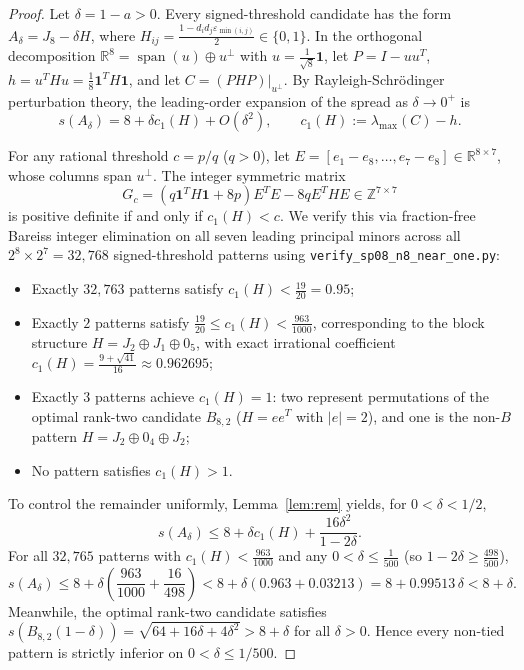 \documentclass[11pt,reqno]{article}
\theoremstyle{definition}
\newcommand{\R}{\mathbb{R}}
\newcommand{\Z}{\mathbb{Z}}
\newcommand{\one}{\mathbf{1}}
\begin{document}
\begin{proof}
Let $\delta = 1 - a > 0$. Every signed-threshold candidate has the form $A_\delta = J_8 - \delta H$, where $H_{ij} = \frac{1 - d_i d_j \varepsilon_{\min(i,j)}}{2} \in \{0, 1\}$. In the orthogonal decomposition $\R^8 = \operatorname{span}(u) \oplus u^\perp$ with $u = \frac{1}{\sqrt{8}}\one$, let $P = I - u u^T$, $h = u^T H u = \frac{1}{8}\one^T H \one$, and let $C = (P H P)|_{u^\perp}$. By Rayleigh-Schr\"odinger perturbation theory, the leading-order expansion of the spread as $\delta \to 0^+$ is
\begin{equation}
s(A_\delta) = 8 + \delta c_1(H) + O(\delta^2), \qquad c_1(H) := \lambda_{\max}(C) - h.
\end{equation}

For any rational threshold $c = p/q$ ($q > 0$), let $E = [e_1 - e_8, \dots, e_7 - e_8] \in \R^{8 \times 7}$, whose columns span $u^\perp$. The integer symmetric matrix
\begin{equation}
G_c = (q \one^T H \one + 8p) E^T E - 8q E^T H E \in \Z^{7 \times 7}
\end{equation}
is positive definite if and only if $c_1(H) < c$. We verify this via fraction-free Bareiss integer elimination \cite{bareiss1968} on all seven leading principal minors across all $2^8 \times 2^7 = 32{,}768$ signed-threshold patterns using \texttt{verify\_sp08\_n8\_near\_one.py}:
\begin{itemize}
    \item Exactly $32{,}763$ patterns satisfy $c_1(H) < \frac{19}{20} = 0.95$;
    \item Exactly $2$ patterns satisfy $\frac{19}{20} \le c_1(H) < \frac{963}{1000}$, corresponding to the block structure $H = J_2 \oplus J_1 \oplus 0_5$, with exact irrational coefficient $c_1(H) = \frac{9 + \sqrt{41}}{16} \approx 0.962695$;
    \item Exactly $3$ patterns achieve $c_1(H) = 1$: two represent permutations of the optimal rank-two candidate $B_{8, 2}$ ($H = e e^T$ with $|e| = 2$), and one is the non-$B$ pattern $H = J_2 \oplus 0_4 \oplus J_2$;
    \item No pattern satisfies $c_1(H) > 1$.
\end{itemize}

To control the remainder uniformly, Lemma~\ref{lem:rem} yields, for $0 < \delta < 1/2$,
\begin{equation}
s(A_\delta) \le 8 + \delta c_1(H) + \frac{16\delta^2}{1 - 2\delta}.
\end{equation}
For all $32{,}765$ patterns with $c_1(H) < \frac{963}{1000}$ and any $0 < \delta \le \frac{1}{500}$ (so $1 - 2\delta \ge \frac{498}{500}$),
\begin{equation}
s(A_\delta) \le 8 + \delta \left( \frac{963}{1000} + \frac{16}{498} \right) < 8 + \delta \left( 0.963 + 0.03213 \right) = 8 + 0.99513\,\delta < 8 + \delta.
\end{equation}
Meanwhile, the optimal rank-two candidate satisfies $s(B_{8, 2}(1-\delta)) = \sqrt{64 + 16\delta + 4\delta^2} > 8 + \delta$ for all $\delta > 0$. Hence every non-tied pattern is strictly inferior on $0 < \delta \le 1/500$.


\end{proof}
\end{document}
